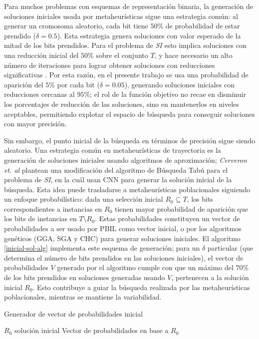 Para muchos problemas con esquemas de representación binaria, la generación de soluciones iniciales usada por metaheurísticas sigue una estrategia común: al generar un cromosoma aleatorio, cada bit tiene $50\%$ de probabilidad de estar prendido ($\delta = 0.5$). Esta estrategia genera soluciones con valor esperado de la mitad de los bits prendidos. Para el problema de \emph{SI} esto implica soluciones con una reducción inicial del $50\%$ sobre el conjunto $T$, y hace necesario un alto número de iteraciones para lograr obtener soluciones con reducciones significativas \cite{cano2003using}. Por esta razón, en el presente trabajo se usa una probabilidad de aparición del $5\%$ por cada bit ($\delta = 0.05$), generando soluciones iniciales con reducciones cercanas al $95\%$; el rol de la función objetivo no recae en disminuir los porcentajes de reducción de las soluciones, sino en mantenerlos en niveles aceptables, permitiendo explotar el espacio de búsqueda para conseguir soluciones con mayor precisión.

Sin embargo, el punto inicial de la búsqueda en términos de precisión sigue siendo aleatorio. Una estrategia común en metaheurísticas de trayectoria es la generación de soluciones iniciales usando algoritmos de aproximación; \emph{Cerveron et. al} \cite{cerveron2001another} plantean una modificación del algoritmo de Búsqueda Tabú para el problema de \emph{SI}, en la cuál usan CNN para generar la solución inicial de la búsqueda. Esta idea puede trasladarse a metaheurísticas poblacionales siguiendo un enfoque probabilístico: dada una selección inicial $R_0 \subseteq T$, los bits correspondientes a instancias en $R_0$ tienen mayor probabilidad de aparición que los bits de instancias en $T \setminus R_0$. Estas probabilidades constituyen un vector de probabilidades a ser usado por PBIL como vector inicial, o por los algoritmos genéticos (GGA, SGA y CHC) para generar soluciones iniciales. El algoritmo \ref{inicial-sol-alg} implementa este esquema de generación; para un $\delta$ particular (que determina el número de bits prendidos en las soluciones iniciales), el vector de probabilidades $V$ generado por el algoritmo cumple con que un máximo del $70\%$ de los bits prendidos en soluciones generadas usando $V$, pertenecen a la solución inicial $R_0$. Esto contribuye a guiar la búsqueda realizada por las metaheurísticas poblacionales, mientras se mantiene la variabilidad.

\begin{algorithm}
\caption{Generador de vector de probabilidades inicial}
\label{inicial-sol-alg}
\begin{algorithmic}[1]

\Require $R_0$ solución inicial
\Ensure Vector de probabilidades en base a $R_0$

	\Else
	\EndIf
\EndFor
\State {}
\end{algorithmic}
\end{algorithm}

